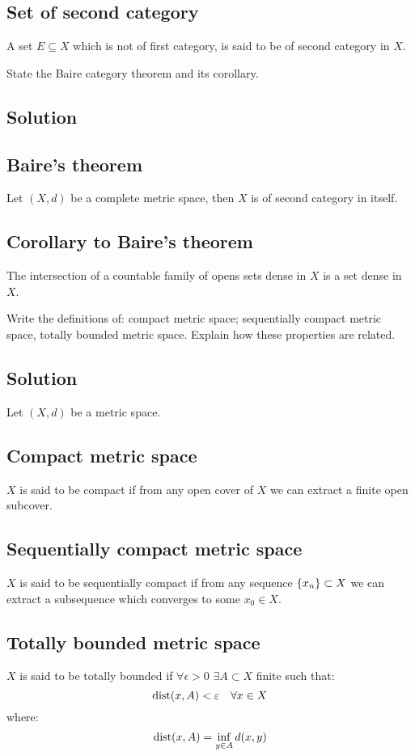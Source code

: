 \subsection{Set of second category}
A set $E \subseteq X$ which is not of first category, is said to be of second category in $X$.


\question
State the Baire category theorem and its corollary.

\subsection*{Solution}

\subsection{Baire's theorem}
Let $(X,d)$ be a complete metric space, then $X$ is of second category in itself.

\subsection{Corollary to Baire's theorem}
The intersection of a countable family of opens sets dense in $X$ is a set dense in $X$.

\question
Write the definitions of: compact metric space; sequentially compact metric space, totally bounded metric space. Explain how these properties are related.

\subsection*{Solution}
Let $(X,d)$ be a metric space.

\subsection{Compact metric space}
$X$ is said to be compact if from any open cover of $X$ we can extract a finite open subcover.

\subsection{Sequentially compact metric space}
$X$ is said to be sequentially compact if from any sequence $\{ x_n \} \subset X$ we can extract a subsequence which converges to some $x_0\in X$.

\subsection{Totally bounded metric space}
$X$ is said to be totally bounded if $\forall \epsilon>0$ $\exists A \subset X$ finite such that:
\[
    \operatorname*{dist}(x,A)<\varepsilon \quad \forall x \in X     
\]
where:
\[
   \operatorname*{dist}(x,A) = \inf_{ y \in A } d(x,y) 
\]

